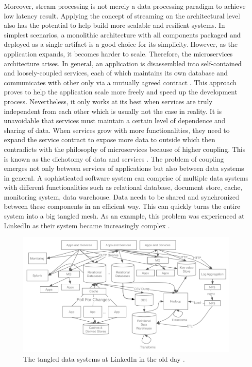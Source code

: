 Moreover, stream processing is not merely a data processing paradigm to achieve low latency result. Applying the concept of streaming on the architectural level also has the potential to help build more scalable and resilient systems. In simplest scenarios, a monolithic architecture with all components packaged and deployed as a single artifact is a good choice for its simplicity. However, as the application expands, it becomes harder to scale. Therefore, the microservices architecture arises. In general, an application is disassembled into self-contained and loosely-coupled services, each of which maintains its own database and communicates with other only via a mutually agreed contract \cite{microservices}. This approach proves to help the application scale more freely and speed up the development process. Nevertheless, it only works at its best when services are truly independent from each other which is usually not the case in reality. It is unavoidable that services must maintain a certain level of dependence and sharing of data. When services grow with more functionalities, they need to expand the service contract to expose more data to outside which then contradicts with the philosophy of microservices because of higher coupling. This is known as the dichotomy of data and services \cite{stopford2018designing}. The problem of coupling emerges not only between services of applications but also between data systems in general. A sophisticated software system can comprise of multiple data systems with different functionalities such as relational database, document store, cache, monitoring system, data warehouse. Data needs to be shared and synchronized between these components in an efficient way. This can quickly turns the entire system into a big tangled mesh. As an example, this problem was experienced at LinkedIn as their system became increasingly complex \cite{eventstreamingplatform}. 

\begin{figure}[h]
	\includegraphics[width=\linewidth]{images/linkedin-data-flow-ugly.png}
	\caption{The tangled data systems at LinkedIn in the old day \cite{eventstreamingplatform}.}
	\label{fig:tangledsystem}
\end{figure}


